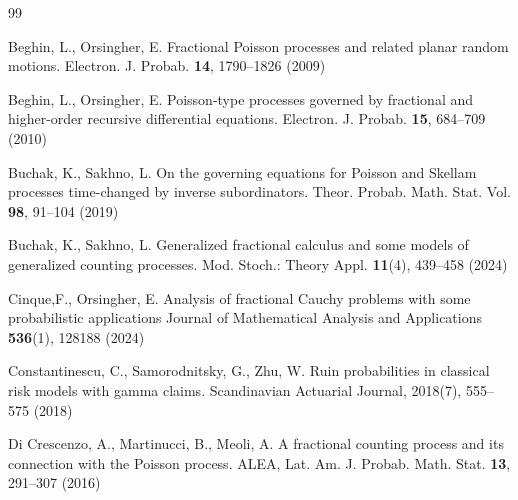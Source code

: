 \documentclass[12pt]{article}
\theoremstyle{definition}
\theoremstyle{plain}
\begin{document}

\begin{thebibliography}{99}



 Beghin, L., Orsingher, E.
Fractional Poisson processes and related planar random motions. Electron. J. Probab. {\bf14}, 1790--1826 (2009)

 Beghin, L., Orsingher, E.
Poisson-type processes governed by fractional and higher-order recursive differential equations. Electron. J. Probab. {\bf15}, 684--709 (2010)



 Buchak, K., Sakhno, L.  On the governing equations for Poisson and Skellam processes
time-changed by inverse subordinators. Theor. Probab. Math. Stat. Vol. {\bf98},  91--104 (2019)

 Buchak, K., Sakhno, L.  Generalized fractional calculus and some models of generalized counting processes. Mod. Stoch.: Theory Appl.
{\bf11}(4), 439--458 (2024)


 Cinque,F.,  Orsingher, E. Analysis of fractional Cauchy problems with some probabilistic applications
Journal of Mathematical Analysis and Applications {\bf 536}(1), 128188 (2024)

Constantinescu, C., Samorodnitsky, G.,  Zhu, W.  Ruin probabilities in classical risk models with gamma claims. Scandinavian Actuarial Journal, 2018(7), 555--575 (2018)


 Di Crescenzo, A.,  Martinucci, B.,  Meoli, A. A fractional counting process and its connection with the Poisson process. ALEA, Lat. Am. J. Probab. Math. Stat. {\bf13}, 291--307 (2016)


\end{thebibliography}
\end{document}
